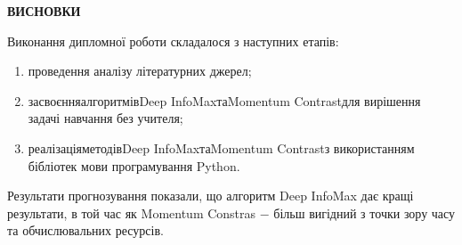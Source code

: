 \begin{center}
\textbf{ВИСНОВКИ}
\end{center}
\label{sec:Summary}

Виконання дипломної роботи складалося з наступних етапів:

\begin{enumerate}
	\item проведення аналізу літературних джерел;
	\item засвоєння\hfill алгоритмів\hfill Deep InfoMax\hfill та\hfill Momentum Contrast\hfill для\newline \hspace*{-20mm} вирішення задачі навчання без учителя;
	\item реалізація\hfill методів\hfill Deep InfoMax\hfill та\hfill Momentum Contrast\hfill з\newline \hspace*{-20mm} використанням бібліотек мови програмування Python.
\end{enumerate}

Результати прогнозування показали, що алгоритм Deep InfoMax дає кращі результати, в той час як Momentum Constras $-$ більш вигідний з точки зору часу та обчислювальних ресурсів.
